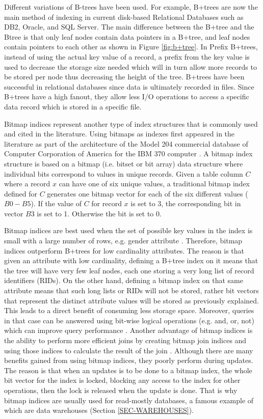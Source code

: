 \documentclass[12pt,a4paper]{article}
\begin{document}
Different variations of B-trees have been used. For example, B+trees are now the main method of indexing in current disk-based Relational Databases
\cite{lightstone2007physical} such as DB2, Oracle, and SQL Server. The main difference between the B+tree and the Btree is that only leaf nodes contain data
pointers in a B+tree, and leaf nodes contain pointers to each other as shown in Figure \ref{fig:b+tree}. In Prefix B+trees, instead of using the actual key
value of a record, a prefix from the key value is used to decrease the storage size needed which will in turn allow more records to be stored per node thus
decreasing the height of the tree. B+trees have been successful in relational databases since data is ultimately recorded in files. Since B+trees have a high
fanout, they allow less I/O operations to access a specific data record which is stored in a specific file.

Bitmap indices represent another type of index structures that is commonly used and cited in the literature. Using bitmaps as indexes first appeared in the
literature as part of the architecture of the Model 204 commercial database of Computer Corporation of America for the IBM 370 computer \cite{patrick1987model}.
A bitmap index structure is based on a bitmap (i.e. bitset or bit array) data structure where individual bits correspond to values in unique records. Given a
table column $C$ where a record $x$ can have one of six unique values, a traditional bitmap index defined for $C$ generates one bitmap vector for each of the
six different values ($B0-B5$). If the value of $C$ for record $x$ is set to 3, the corresponding bit in vector $B3$ is set to 1. Otherwise the bit is set to 0.

Bitmap indices are best used when the set of possible key values in the index is small with a large number of rows, e.g. gender attribute \cite{212001}.
Therefore, bitmap indices outperform B+trees for low cardinality attributes. The reason is that given an attribute with low cardinality, defining a B+tree index
on it means that the tree will have very few leaf nodes, each one storing a very long list of record identifiers (RIDs). On the other hand, defining a
bitmap index on that same attribute means that such long lists or RIDs will not be stored, rather bit vectors that represent the distinct attribute values will
be stored as previously explained. This leads to a direct benefit of consuming less storage space. Moreover, queries in that case can be answered using bit-wise
logical operations (e.g. and, or, not) which can improve query performance \cite{253268}. Another advantage of bitmap indices is the ability to perform more
efficient joins by creating bitmap join indices and using those indices to calculate the result of the join \cite{212001}. Although there are many benefits
gained from using bitmap indices, they poorly perform during updates. The reason is that when an updates is to be done to a bitmap index, the whole bit vector
for the index is locked, blocking any access to the index for other operations, then the lock is released when the update is done. That is why bitmap indices
are usually used for read-mostly databases, a famous example of which are data warehouses (Section \ref{SEC-WAREHOUSES}).
\end{document}
